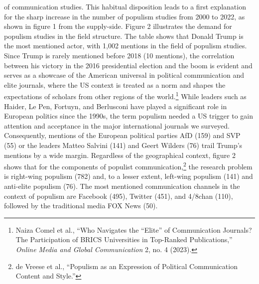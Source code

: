 \documentclass{tufte-handout}
\begin{document}
of communication studies. This habitual disposition leads to a first
explanation for the sharp increase in the number of populism studies
from 2000 to 2022, as shown in figure 1 from the supply-side. Figure 2
illustrates the demand for populism studies in the field structure. The
table shows that Donald Trump is the most mentioned actor, with 1,002
mentions in the field of populism studies. Since Trump is rarely
mentioned before 2018 (10 mentions), the correlation between his victory
in the 2016 presidential election and the boom is evident and serves as
a showcase of the American universal in political communication and
elite journals, where the US context is treated as a norm and shapes the
expectations of scholars from other regions of the world.\footnote{Naiza
  Comel et al., ``Who Navigates the ``Elite'' of Communication Journals?
  The Participation of BRICS Universities in Top-Ranked Publications,''
  \emph{Online Media and Global Communication} 2, no. 4 (2023).} While
leaders such as Haider, Le Pen, Fortuyn, and Berlusconi have played a
significant role in European politics since the 1990s, the term populism
needed a US trigger to gain attention and acceptance in the major
international journals we surveyed. Consequently, mentions of the
European political parties AfD (159) and SVP (55) or the leaders Matteo
Salvini (141) and Geert Wilders (76) trail Trump's mentions by a wide
margin. Regardless of the geographical context, figure 2 shows that for
the components of populist communication,\footnote{de Vreese et al.,
  ``Populism as an Expression of Political Communication Content and
  Style.''} the research problem is right-wing populism (782) and, to a
lesser extent, left-wing populism (141) and anti-elite populism (76).
The most mentioned communication channels in the context of populism are
Facebook (495), Twitter (451), and 4/8chan (110), followed by the
traditional media FOX News (50).
\end{document}
